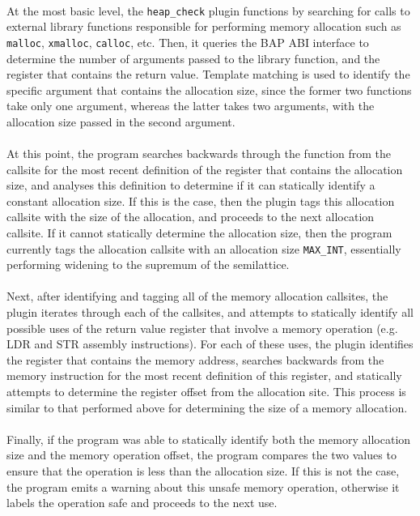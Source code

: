 \documentclass[letterpaper,11pt]{article}
\begin{document}
\paragraph{}
At the most basic level, the \texttt{heap\_check} plugin functions by searching for calls to
external library functions responsible for performing memory allocation such as
\texttt{malloc}, \texttt{xmalloc}, \texttt{calloc}, etc. Then, it queries the
BAP ABI interface to determine the number of arguments passed to the library
function, and the register that contains the return value. Template matching is
used to identify the specific argument that contains the allocation size, since
the former two functions take only one argument, whereas the latter takes two
arguments, with the allocation size passed in the second argument.

\paragraph{}
At this point, the program searches backwards through the function from the
callsite for the most recent definition of the register that contains the
allocation size, and analyses this definition to determine if it can statically
identify a constant allocation size. If this is the case, then the plugin tags
this allocation callsite with the size of the allocation, and proceeds to the
next allocation callsite. If it cannot statically determine the allocation
size, then the program currently tags the allocation callsite with an
allocation size \texttt{MAX\_INT}, essentially performing widening to the supremum of the
semilattice.

\paragraph{}
Next, after identifying and tagging all of the memory allocation callsites, the
plugin iterates through each of the callsites, and attempts to statically
identify all possible uses of the return value register that involve a memory
operation (e.g. LDR and STR assembly instructions). For each of these uses, the
plugin identifies the register that contains the memory address, searches
backwards from the memory instruction for the most recent definition of this
register, and statically attempts to determine the register offset from the
allocation site. This process is similar to that performed above for
determining the size of a memory allocation.

\paragraph{}
Finally, if the program was able to statically identify both the memory
allocation size and the memory operation offset, the program compares the two
values to ensure that the operation is less than the allocation size. If this
is not the case, the program emits a warning about this unsafe memory
operation, otherwise it labels the operation safe and proceeds to the next use.
\end{document}
